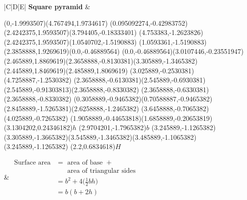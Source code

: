 \begin{table}[H]
\begin{tabular}{|C|D|E|}
\hline
\textbf{Square pyramid}
&
\begin{center}

\scalebox{0.7} %
{
\begin{pspicture}(0,-1.9993507)(4.767494,1.9734617)
\pspolygon[linewidth=0.028222222,fillstyle=solid](0.095092274,-0.42983752)(2.4242375,1.9593507)(3.794405,-0.18333401)
\pspolygon[linewidth=0.028222222,fillstyle=solid](4.753383,-1.2623826)(2.4242375,1.9593507)(1.0540702,-1.5190883)
\pspolygon[linewidth=0.028222222,fillstyle=solid](1.0593361,-1.5190883)(2.3858888,1.9269619)(0.0,-0.46889564)
\psline[linewidth=0.022cm,linestyle=dashed,dash=0.16cm 0.16cm](0.0,-0.46889564)(3.0107446,-0.23551947)
\psline[linewidth=0.027999999,linestyle=dotted,dotsep=0.16cm](2.465889,1.8869619)(2.3658888,-0.8130381)(3.305889,-1.3465382)(2.445889,1.8469619)(2.485889,1.8069619)
\psline[linewidth=0.024cm,linestyle=dashed,dash=0.16cm 0.16cm](3.025889,-0.2530381)(4.7258887,-1.2530382)
\psline[linewidth=0.02](2.3658888,-0.6130381)(2.545889,-0.6930381)(2.545889,-0.91303813)(2.3658888,-0.8330382)
\psline[linewidth=0.02cm](2.3658888,-0.6330381)(2.3658888,-0.8330382)
\psline[linewidth=0.04cm](0.3058889,-0.9465382)(0.70588887,-0.9465382)
\psline[linewidth=0.04cm](2.8458889,-1.5265381)(2.6258888,-1.2465382)
\psline[linewidth=0.04cm](3.6458888,-0.7065382)(4.025889,-0.7265382)
\psline[linewidth=0.04cm](1.9058889,-0.44653818)(1.6858889,-0.20653819)
\rput(3.1304202,0.24346182){$h$}
\rput(2.9704201,-1.7965382){$b$}
\psline[linewidth=0.02](3.245889,-1.1265382)(3.305889,-1.3665382)(3.545889,-1.3465382)(3.485889,-1.1065382)(3.245889,-1.1265382)
\rput(2.2,0.6834618){$H$}
\end{pspicture} 
}
\end{center} 
&
$\begin{aligned}
\mbox{Surface area} &= \mbox{ area of base } +\\
&~~~~~~\mbox{ area of triangular sides } \\
&=b^{2} + 4\Big(\frac{1}{2}bh\Big)\\
&=b(b+2h)
 \end{aligned}$
\\ \hline



\end{tabular}
\end{table}

